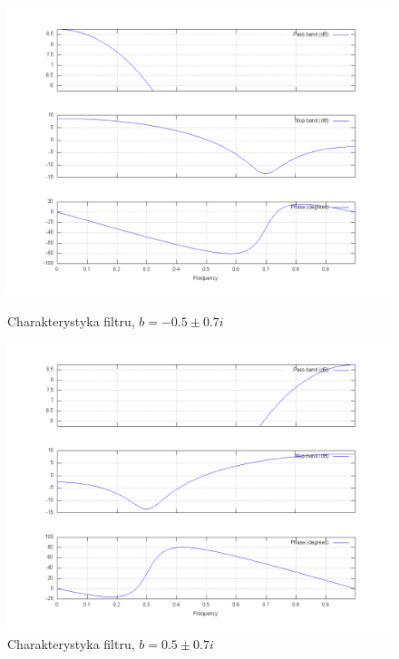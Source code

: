 \documentclass[wide,a4paper,titlepage,12pt]{mwart}
\begin{document}
  \begin{figure}[htbp]
    \begin{center}
      \includegraphics[scale=.3]{out/fig25.png}
      \caption{\label{fig25} Charakterystyka filtru, $b=-0.5\pm0.7i$}
      \includegraphics[scale=.3]{out/fig26.png}
      \caption{\label{fig26} Charakterystyka filtru, $b=0.5\pm0.7i$}

    \end{center}
  \end{figure}
\end{document}
